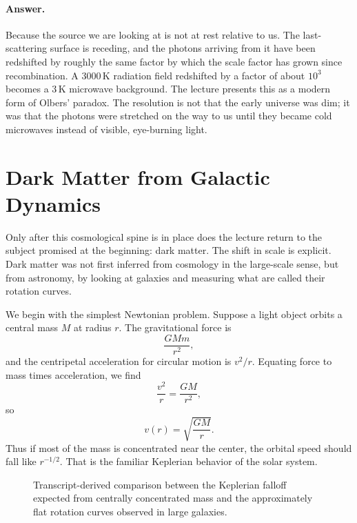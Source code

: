 \paragraph{Answer.} Because the source we are looking at is not at rest relative to us. The last-scattering surface is receding, and the photons arriving from it have been redshifted by roughly the same factor by which the scale factor has grown since recombination. A \(3000\,\mathrm{K}\) radiation field redshifted by a factor of about \(10^3\) becomes a \(3\,\mathrm{K}\) microwave background. The lecture presents this as a modern form of Olbers' paradox. The resolution is not that the early universe was dim; it was that the photons were stretched on the way to us until they became cold microwaves instead of visible, eye-burning light.

\section{Dark Matter from Galactic Dynamics}

Only after this cosmological spine is in place does the lecture return to the subject promised at the beginning: dark matter. The shift in scale is explicit. Dark matter was not first inferred from cosmology in the large-scale sense, but from astronomy, by looking at galaxies and measuring what are called their rotation curves.

We begin with the simplest Newtonian problem. Suppose a light object orbits a central mass \(M\) at radius \(r\). The gravitational force is
\begin{equation}
\frac{GMm}{r^2},
\end{equation}
and the centripetal acceleration for circular motion is \(v^2/r\). Equating force to mass times acceleration, we find
\begin{equation}
\frac{v^2}{r}=\frac{GM}{r^2},
\end{equation}
so
\begin{equation}
v(r)=\sqrt{\frac{GM}{r}}.
\end{equation}
Thus if most of the mass is concentrated near the center, the orbital speed should fall like \(r^{-1/2}\). That is the familiar Keplerian behavior of the solar system.

\begin{figure}[ht]
\centering
{}
\caption{Transcript-derived comparison between the Keplerian falloff expected from centrally concentrated mass and the approximately flat rotation curves observed in large galaxies.}
\end{figure}

